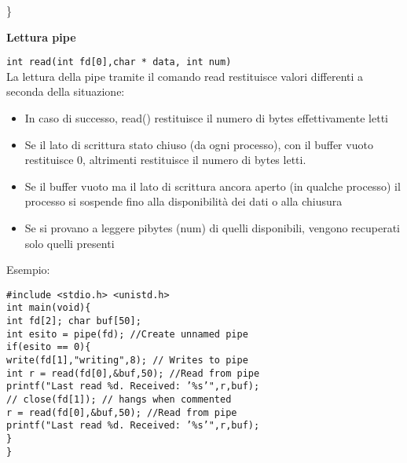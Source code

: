 \begin{flushleft}
\begin{flushleft}
\begin{flushleft}
\begin{flushleft}
{                \}
        }
      \end{flushleft}
    \end{flushleft}
    \begin{flushleft}
      \textbf{Lettura pipe}\par 
      \texttt{int read(int fd[0],char * data, int num)}\\
      La lettura della pipe tramite il comando read restituisce valori differenti a seconda 
      della situazione:
      \begin{itemize}
        \item In caso di successo, read() restituisce il numero di bytes effettivamente letti
        \item Se il lato di scrittura \ace stato chiuso (da ogni processo), con il buffer vuoto 
              restituisce 0, altrimenti restituisce il numero di bytes letti.
        \item Se il buffer \ace vuoto ma il lato di scrittura \ace ancora aperto (in qualche processo) 
              il processo si sospende fino alla disponibilità dei dati o alla chiusura
        \item Se si provano a leggere pi\acu bytes (num) di quelli disponibili, vengono recuperati 
              solo quelli presenti
      \end{itemize}
      Esempio:
      \begin{flushleft}
        \texttt{\#include <stdio.h> <unistd.h>\\
        int main(void)\{ \\
        \halftab int fd[2]; char buf[50];\\
        \halftab int esito = pipe(fd); //Create unnamed pipe\\
        \halftab if(esito == 0)\{ \\
        \tab write(fd[1],"writing",8); // Writes to pipe\\
        \tab int r = read(fd[0],\&buf,50); //Read from pipe\\
        \tab printf("Last read \%d. Received: '\%s'\n",r,buf);\\
        \tab // close(fd[1]); // hangs when commented\\
        \tab r = read(fd[0],\&buf,50); //Read from pipe\\
        \tab printf("Last read \%d. Received: '\%s'\n",r,buf);\\
        \halftab \}\\ \}}
      \end{flushleft}

\end{flushleft}
\end{flushleft}
\end{flushleft}
